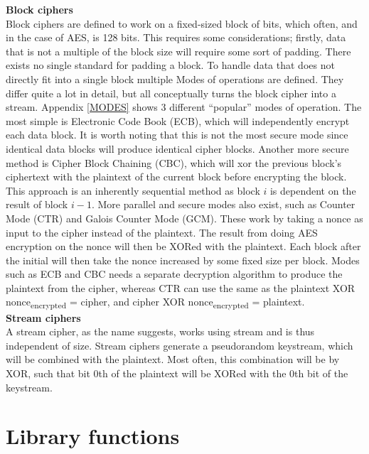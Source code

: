 \documentclass[a4paper, openany]{book}
\begin{document}
\textbf{Block ciphers}\\
Block ciphers are defined to work on a fixed-sized block of bits, which often, and in the case of AES, is 128 bits. This requires some considerations; firstly, data that is not a multiple of the block size will require some sort of padding. There exists no single standard for padding a block. To handle data that does not directly fit into a single block multiple Modes of operations are defined. They differ quite a lot in detail, but all conceptually turns the block cipher into a stream. Appendix \ref{MODES} shows 3 different ``popular'' modes of operation. The most simple is Electronic Code Book (ECB), which will independently encrypt each data block. It is worth noting that this is not the most secure mode since identical data blocks will produce identical cipher blocks. Another more secure method is Cipher Block Chaining (CBC), which will xor the previous block's ciphertext with the plaintext of the current block before encrypting the block. This approach is an inherently sequential method as block \(i\) is dependent on the result of block \(i-1\). More parallel and secure modes also exist, such as Counter Mode (CTR) and Galois Counter Mode (GCM). These work by taking a nonce as input to the cipher instead of the plaintext. The result from doing AES encryption on the nonce will then be XORed with the plaintext. Each block after the initial will then take the nonce increased by some fixed size per block. Modes such as ECB and CBC needs a separate decryption algorithm to produce the plaintext from the cipher, whereas CTR can use the same as the plaintext XOR nonce\textsubscript{encrypted} = cipher, and cipher XOR nonce\textsubscript{encrypted} = plaintext.\\

\textbf{Stream ciphers}\\
A stream cipher, as the name suggests, works using stream and is thus independent of size. Stream ciphers generate a pseudorandom keystream, which will be combined with the plaintext. Most often, this combination will be by XOR, such that bit 0th of the plaintext will be XORed with the 0th bit of the keystream.
\chapter{Library functions}
\label{sec:orgfabef9c}
\end{document}
